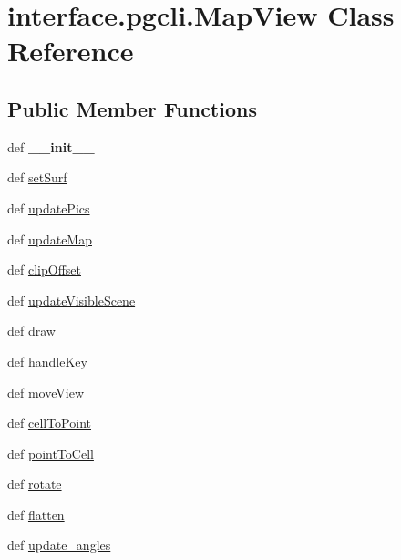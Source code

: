 \hypertarget{classinterface_1_1pgcli_1_1_map_view}{\section{interface.\-pgcli.\-Map\-View \-Class \-Reference}
\label{classinterface_1_1pgcli_1_1_map_view}
}
\subsection*{\-Public \-Member \-Functions}
\begin{DoxyCompactItemize}
\item 
\hypertarget{classinterface_1_1pgcli_1_1_map_view_a9da806482980830e456630a655d5f51d}{def {\bfseries \-\_\-\-\_\-init\-\_\-\-\_\-}}\label{classinterface_1_1pgcli_1_1_map_view_a9da806482980830e456630a655d5f51d}

\item 
def \hyperlink{classinterface_1_1pgcli_1_1_map_view_ae910bd3f2658fefda2adb3f7991fd35b}{set\-Surf}
\item 
def \hyperlink{classinterface_1_1pgcli_1_1_map_view_a620783b72087e3d5950ce0411470390a}{update\-Pics}
\item 
def \hyperlink{classinterface_1_1pgcli_1_1_map_view_a2706f8880ed0935629fce4f413155801}{update\-Map}
\item 
def \hyperlink{classinterface_1_1pgcli_1_1_map_view_a82f2c07b04c94a8b66f83deddf37cbdd}{clip\-Offset}
\item 
def \hyperlink{classinterface_1_1pgcli_1_1_map_view_a1de1882629b6b86818849b27e8ff243c}{update\-Visible\-Scene}
\item 
def \hyperlink{classinterface_1_1pgcli_1_1_map_view_a9722a54c635d6194a598709a6d2c7b88}{draw}
\item 
def \hyperlink{classinterface_1_1pgcli_1_1_map_view_af707815529d4a3f04652224867496a3d}{handle\-Key}
\item 
def \hyperlink{classinterface_1_1pgcli_1_1_map_view_a177709a045943de34d4b2363a63da627}{move\-View}
\item 
def \hyperlink{classinterface_1_1pgcli_1_1_map_view_a24e1c5ff32a5e041cda0349b4851615b}{cell\-To\-Point}
\item 
def \hyperlink{classinterface_1_1pgcli_1_1_map_view_ae9dab6dfcd8690f77b8b4a7c8da9d73d}{point\-To\-Cell}
\item 
def \hyperlink{classinterface_1_1pgcli_1_1_map_view_a992670efcedf95a8cc40ccfe189e9bb2}{rotate}
\item 
def \hyperlink{classinterface_1_1pgcli_1_1_map_view_ae95c7de77653ab67c8a4e9db5b7f994c}{flatten}
\item 
def \hyperlink{classinterface_1_1pgcli_1_1_map_view_a9d919d26df27c12a1dd0959aa856db6d}{update\-\_\-angles}
\end{DoxyCompactItemize}
